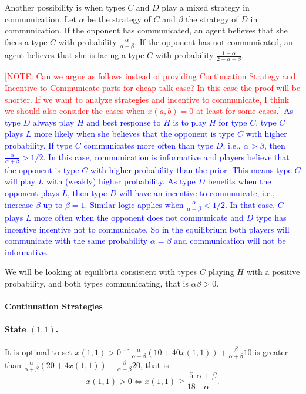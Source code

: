 \documentclass[12pt]{article}
\theoremstyle{break}
\begin{document}
Another possibility is when types $C$ and $D$ play a mixed strategy in communication. Let $\alpha$ be the strategy of $C$ and $\beta$ the strategy of $D$ in communication. If the opponent has communicated, an agent believes that she faces a type $C$ with probability $\frac{\alpha}{\alpha+\beta}$. If the opponent has not communicated, an agent believes that she is facing a type $C$ with probability $\frac{1-\alpha}{2-\alpha-\beta}$.

\textcolor{red}{[NOTE: Can we argue as follows instead of providing Continuation Strategy and Incentive to Communicate parts for cheap talk case? In this case the proof will be shorter. If we want to analyze strategies and incentive to communicate, I think we should also consider the cases when $x(a,b)=0$ at least for some cases.]} \textcolor{blue}{As type $D$ always play $H$ and best response to $H$ is to play $H$ for type $C$, type $C$ plays $L$ more likely when she believes that the opponent is type $C$ with higher probability. If type $C$ communicates more often than type $D$, i.e., $\alpha>\beta$, then $\frac{\alpha}{\alpha+\beta}>1/2$. In this case, communication is informative and players believe that the opponent is type $C$ with higher probability than the prior. This means type $C$ will play $L$ with (weakly) higher probability. As type $D$ benefits when the opponent plays $L$, then type $D$ will have an incentive to communicate, i.e., increase $\beta$ up to $\beta=1$. Similar logic applies when $\frac{\alpha}{\alpha+\beta}<1/2$. In that case, $C$ plays $L$ more often when the opponent does not communicate and $D$ type has incentive incentive not to communicate. So in the equilibrium both players will communicate with the same probability $\alpha=\beta$ and communication will not be informative.}

We will be looking at equilibria consistent with types $C$ playing $H$ with a positive probability, and both types communicating, that is $\alpha\beta>0$. 

\paragraph{Continuation Strategies}

\paragraph{State $(1,1)$.} It is optimal to set $x(1,1)>0$ if $\frac{\alpha}{\alpha+\beta}(10+40x(1,1))+\frac{\beta}{\alpha+\beta}10$ is greater than $\frac{\alpha}{\alpha+\beta}(20+4x(1,1))+\frac{\beta}{\alpha+\beta}20$, that is 
\begin{equation}\label{CWC-BR11}
	x(1,1)>0 \Leftrightarrow x(1,1)\geq \frac{5}{18}\frac{\alpha+\beta}{\alpha}.
\end{equation}
\end{document}

